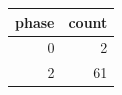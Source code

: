 \begin{tabular}{rr}
\toprule
phase & count \\
\midrule
0 & 2 \\
2 & 61 \\
\bottomrule
\end{tabular}
